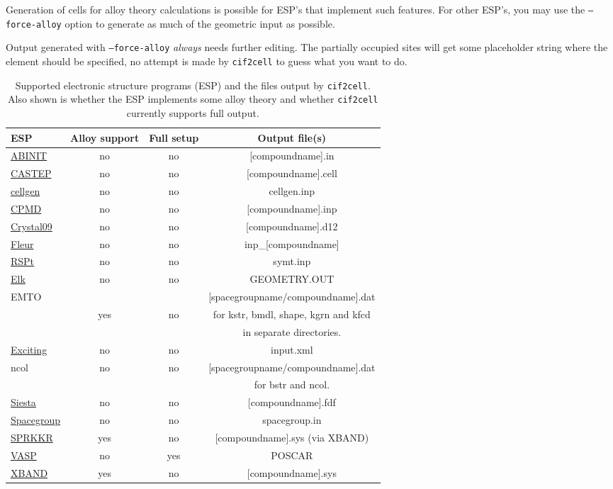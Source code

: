 \documentclass[11pt]{article}
\newcommand{\ciftocell}{\texttt{cif2cell}}
\newenvironment{warning}[1][Warning!]{\begin{trivlist}
\item[\hskip \labelsep {\bfseries #1}]}{\end{trivlist}}
\begin{document}
Generation of cells for alloy theory calculations is possible for ESP's that implement such features. For other ESP's, you may use the \texttt{--force-alloy} option to generate as much of the geometric input as possible. 
\begin{warning}
Output generated with \texttt{--force-alloy} \emph{always} needs further editing. The partially occupied sites will get some placeholder string where the element should be specified, no attempt is made by \ciftocell{} to guess what you want to do.
\end{warning}

\begin{table}[htdp]
\caption{Supported electronic structure programs (ESP) and the files output by \ciftocell. Also shown is whether the ESP implements some alloy theory and whether \ciftocell{} currently supports full output.}
\begin{center}
\begin{tabular}{l|c|c|c}
ESP  & Alloy support & Full setup & Output file(s)\\ \hline
\href{http://www.abinit.org/}{ABINIT} & no & no & [compoundname].in\\
\href{http://www.castep.org/}{CASTEP} & no & no & [compoundname].cell\\
\href{http://www.fplmto-rspt.org/}{cellgen} & no & no & cellgen.inp\\
\href{http://www.cpmd.org}{CPMD} & no & no & [compoundname].inp\\
\href{http://www.crystal.unito.it/}{Crystal09} & no & no & [compoundname].d12\\
\href{http://www.flapw.de}{Fleur} & no & no & inp\_[compoundname]\\
\href{http://www.fplmto-rspt.org/}{RSPt} & no & no & symt.inp\\
\href{http://elk.sourceforge.net}{Elk} & no & no & GEOMETRY.OUT\\
\multirow{3}{*}{EMTO} & & & [spacegroupname/compoundname].dat \\ 
 & yes & no & for kstr, bmdl, shape, kgrn and kfcd \\
 &  & & in separate directories.\\
\href{http://exciting-code.org}{Exciting} & no & no & input.xml\\
\multirow{2}{*}{ncol} & no & no & [spacegroupname/compoundname].dat \\
 &  &  & for bstr and ncol. \\
\href{http://www.icmab.es/dmmis/leem/siesta/}{Siesta} & no & no & [compoundname].fdf\\
\href{http://elk.sourceforge.net}{Spacegroup} & no & no & spacegroup.in\\
\href{http://ebert.cup.uni-muenchen.de/sprkkr}{SPRKKR} & yes & no & [compoundname].sys (via XBAND) \\
\href{http://www.vasp.at/}{VASP} & no  & yes & POSCAR \\
\href{http://ebert.cup.uni-muenchen.de/sprkkr}{XBAND} & yes & no & [compoundname].sys\\
\end{tabular}
\end{center}
\label{esptable}
\end{table}%
\end{document}
